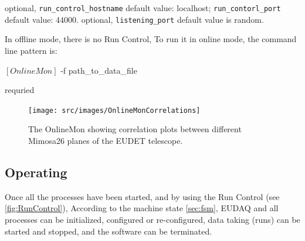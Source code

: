 \begin{description}
optional, \texttt{run\_control\_hostname} default value: localhost;  \texttt{run\_contorl\_port}  default value: 44000.
optional, \texttt{listening\_port} default value is random.
\end{description}

In offline mode, there is no Run Control, To run it in online mode, the command line pattern is:
\begin{listing}[mybash]
$[OnlineMon]$ -f {path_to_data_file}
\end{listing}

\begin{description}
requried
\end{description}

\begin{figure}[htb]
  \begin{center}
    \texttt{[image: src/images/OnlineMonCorrelations]}
    \caption{The OnlineMon showing correlation plots between different
      Mimosa26 planes of the EUDET telescope.}
    \label{fig:OnlineMonPlots}
  \end{center}
\end{figure}

\subsection{Operating}
Once all the processes have been started, 
and by using the Run Control (see \autoref{fig:RunControl}),
According to the machine state \autoref{sec:fsm}, EUDAQ and all processes can be initialized, configured or re-configured, data taking (runs) can be started and stopped, and the software can be terminated.

